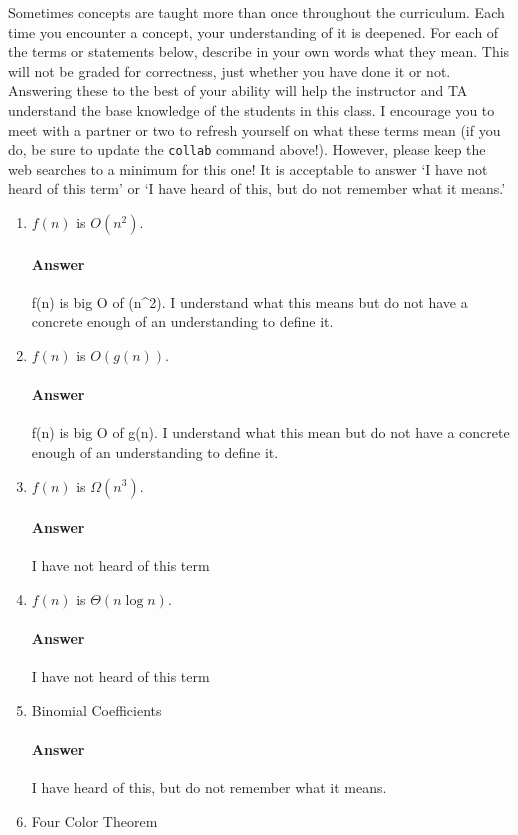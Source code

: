 \documentclass{article}
\begin{document}
Sometimes concepts are taught more than once throughout the curriculum.  Each
time you encounter a concept, your understanding of it is deepened.
For each of the terms or statements below, describe in your own words what they
mean.  This will not be graded for correctness, just whether you have done it or
not.  Answering these to the best of your ability will help the instructor and
TA understand the base knowledge of the students in this class.
I encourage you to meet with a partner or two to refresh yourself on what these
terms mean (if you do, be sure to update the \texttt{collab} command
above!).  However, please keep the web searches to a minimum for this one!  It
is acceptable to answer `I have not heard of this term' or `I have heard of
this, but do not remember what it means.'
\begin{enumerate}
    \item $f(n)$ is $O(n^2)$.
        \paragraph{Answer}
        f(n) is big O of (n^2). I understand what this means but do not have a concrete enough of an understanding to define it.
    \item $f(n)$ is $O(g(n))$.
        \paragraph{Answer}
        f(n) is big O of g(n). I understand what this mean but do not have a concrete enough of an understanding to define it.
    \item $f(n)$ is $\Omega(n^3)$.
        \paragraph{Answer}
        I have not heard of this term
    \item $f(n)$ is $\Theta(n\log n)$.
        \paragraph{Answer}
        I have not heard of this term
    \item Binomial Coefficients
        \paragraph{Answer}
        I have heard of this, but do not remember what it means.
    \item Four Color Theorem

\end{enumerate}
\end{document}
